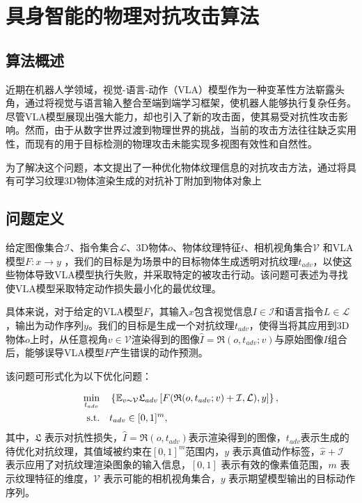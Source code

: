 \section{具身智能的物理对抗攻击算法}
\subsection{算法概述}
近期在机器人学领域，视觉-语言-动作（VLA）模型作为一种变革性方法崭露头角，通过将视觉与语言输入整合至端到端学习框架，使机器人能够执行复杂任务。尽管VLA模型展现出强大能力，却也引入了新的攻击面，使其易受对抗性攻击影响。然而，由于从数字世界过渡到物理世界的挑战，当前的攻击方法往往缺乏实用性，而现有的用于目标检测的物理攻击未能实现多视图有效性和自然性。

为了解决这个问题，本文提出了一种优化物体纹理信息的对抗攻击方法，通过将具有可学习纹理3D物体渲染生成的对抗补丁附加到物体对象上
\subsection{问题定义}

给定图像集合$\mathcal{I} $、指令集合$\mathcal{L} $、3D物体$o$、物体纹理特征$t$、相机视角集合$\mathcal{V}$ 和VLA模型$F: x\rightarrow  y$ ，我们的目标是为场景中的目标物体生成透明对抗纹理$t_{adv}$，以使这些物体导致VLA模型执行失败，并采取特定的被攻击行动。该问题可表述为寻找使VLA模型采取特定动作损失最小化的最优纹理。

具体来说，对于给定的VLA模型$F$，其输入$x$包含视觉信息$I \in \mathcal{I}$和语言指令$L \in \mathcal{L}$，输出为动作序列$y$。我们的目标是生成一个对抗纹理$t_{adv}$，使得当将其应用到3D物体$o$上时，从任意视角$v \in \mathcal{V}$渲染得到的图像$\hat{I} = \mathfrak{R}(o, t_{adv}; v)$与原始图像$I$组合后，能够误导VLA模型$F$产生错误的动作预测。

该问题可形式化为以下优化问题：

\begin{equation}
    \begin{aligned}
    \min_{t_{adv}} &\quad \left\{\mathbb{E}_{v \thicksim  \mathcal{V} } \mathfrak{L} _{adv}\left[ F (\mathfrak{R}  (o, t_{adv}; v )+\mathcal{I}, \mathcal{L} ), y \right ] \right\},\\
    \mathrm{s.t.} &\quad t_{adv} \in [0,1]^m,
    \end{aligned}
\end{equation}
其中，$\mathfrak{L}$ 表示对抗性损失，$\hat {I}=\mathfrak{R} (o, t_{adv})$表示渲染得到的图像，$t_{adv}$表示生成的待优化对抗纹理，其值域被约束在$[0,1]^m$范围内，$y$ 表示真值动作标签，$\hat{x}+\mathcal{I}$ 表示应用了对抗纹理渲染图象的输入信息，$[0,1]$ 表示有效的像素值范围，$m$ 表示纹理特征的维度，$\mathcal{V}$ 表示可能的相机视角集合，$y$ 表示期望模型输出的目标动作序列。

